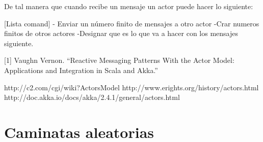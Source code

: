 De tal manera que cuando recibe un mensaje un actor  puede hacer lo siguiente:

[Lista  comand]
- Enviar un n\'umero finito de mensajes a otro actor
-Crar numeros finitos de otros actores
-Designar  que es lo que  va a hacer con los mensajes siguiente.



[1] Vaughn Vernon. “Reactive Messaging Patterns With the Actor Model: Applications and Integration in Scala and Akka.”

http://c2.com/cgi/wiki?ActorsModel
http://www.erights.org/history/actors.html
http://doc.akka.io/docs/akka/2.4.1/general/actors.html

\section {Caminatas aleatorias}
